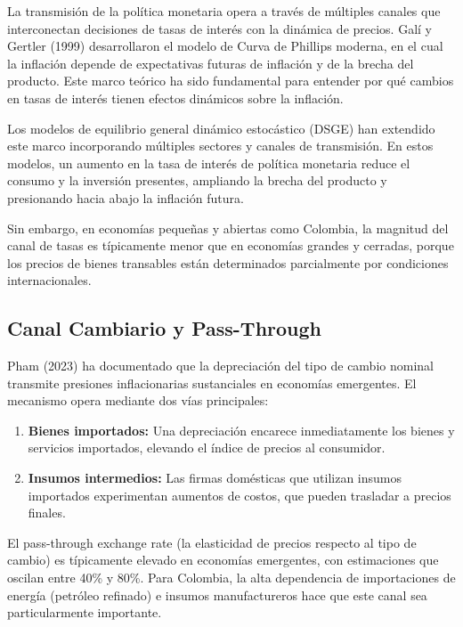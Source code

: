 \documentclass[12pt,a4paper]{article}
\begin{document}
La transmisión de la política monetaria opera a través de múltiples canales que interconectan decisiones de tasas de interés con la dinámica de precios. Galí y Gertler (1999) desarrollaron el modelo de Curva de Phillips moderna, en el cual la inflación depende de expectativas futuras de inflación y de la brecha del producto. Este marco teórico ha sido fundamental para entender por qué cambios en tasas de interés tienen efectos dinámicos sobre la inflación.

Los modelos de equilibrio general dinámico estocástico (DSGE) han extendido este marco incorporando múltiples sectores y canales de transmisión. En estos modelos, un aumento en la tasa de interés de política monetaria reduce el consumo y la inversión presentes, ampliando la brecha del producto y presionando hacia abajo la inflación futura.

Sin embargo, en economías pequeñas y abiertas como Colombia, la magnitud del canal de tasas es típicamente menor que en economías grandes y cerradas, porque los precios de bienes transables están determinados parcialmente por condiciones internacionales.

\subsection{Canal Cambiario y Pass-Through}

Pham (2023) ha documentado que la depreciación del tipo de cambio nominal transmite presiones inflacionarias sustanciales en economías emergentes. El mecanismo opera mediante dos vías principales:

\begin{enumerate}
\item \textbf{Bienes importados:} Una depreciación encarece inmediatamente los bienes y servicios importados, elevando el índice de precios al consumidor.

\item \textbf{Insumos intermedios:} Las firmas domésticas que utilizan insumos importados experimentan aumentos de costos, que pueden trasladar a precios finales.
\end{enumerate}

El pass-through exchange rate (la elasticidad de precios respecto al tipo de cambio) es típicamente elevado en economías emergentes, con estimaciones que oscilan entre 40\% y 80\%. Para Colombia, la alta dependencia de importaciones de energía (petróleo refinado) e insumos manufactureros hace que este canal sea particularmente importante.
\end{document}
